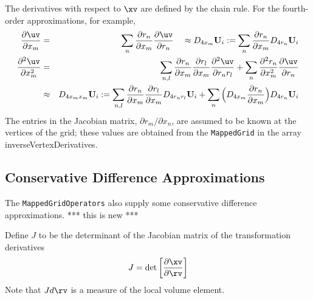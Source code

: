 The derivatives with respect to $\xv$ are defined by the chain rule.
For the fourth-order approximations, for example, 
\begin{eqnarray*}
   {\partial \uv \over \partial x_m } &=&
        \sum_n {\partial r_n \over \partial x_m}
               {\partial \uv \over \partial r_n}
    ~~~ \approx  D_{4x_m} \uvd_i :=
        \sum_n {\partial r_n \over \partial x_m}
               D_{4r_n} \uvd_i                  \\
   {\partial^2 \uv \over \partial x_m^2 } &=&
      \sum_{n,l} {\partial r_n \over \partial x_m}
                 {\partial r_l \over \partial x_m}
                 {\partial^2 \uv \over \partial r_n r_l}
       +\sum_n   {\partial^2 r_n \over \partial x_m^2}
                 {\partial  \uv \over \partial r_n    }  \\
       &\approx& D_{4 x_m x_m}\uvd_i :=
      \sum_{n,l} {\partial r_n \over \partial x_m}
                 {\partial r_l \over \partial x_m}
                 D_{4 r_n r_l } \uvd_i
       +\sum_n  \Big( D_{4 x_m} {\partial r_n \over \partial x_m}\Big)
                 D_{4 r_n} \uvd_i
\end{eqnarray*}
The entries in the Jacobian matrix, ${\partial r_m / \partial x_n}$,
are assumed to be known at the vertices of the grid;
these values are obtained from the {\tt MappedGrid}
in the array {\ff inverse\-Vertex\-Derivatives}. 



\subsection{Conservative Difference Approximations}

   The {\tt MappedGridOperators} also supply some conservative 
difference approximations.  *** this is new ***


Define $J$ to be the determinant of the Jacobian matrix of the transformation derivatives
\[
    J = {\rm det}\left[ {\partial \xv \over \partial \rv} \right]
\]
Note that $J d\rv$ is a measure of the local volume element.

